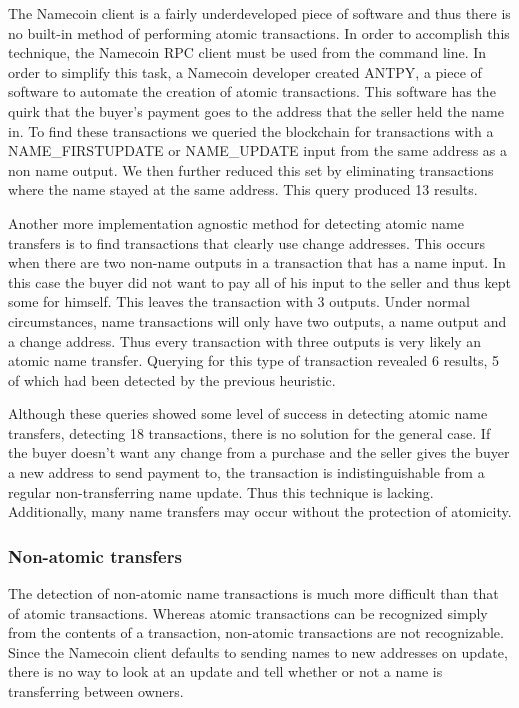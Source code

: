 The Namecoin client is a fairly underdeveloped piece of software and thus there is no built-in method of performing atomic transactions. In order to accomplish this technique, the Namecoin RPC client must be used from the command line. In order to simplify this task, a Namecoin developer created ANTPY, a piece of software to automate the creation of atomic transactions. This software has the quirk that the buyer's payment goes to the address that the seller held the name in. To find these transactions we queried the blockchain for transactions with a NAME\_FIRSTUPDATE or NAME\_UPDATE input from the same address as a non name output. We then further reduced this set by eliminating transactions where the name stayed at the same address. This query produced 13 results.

Another more implementation agnostic method for detecting atomic name transfers is to find transactions that clearly use change addresses. This occurs when there are two non-name outputs in a transaction that has a name input. In this case the buyer did not want to pay all of his input to the seller and thus kept some for himself. This leaves the transaction with 3 outputs. Under normal circumstances, name transactions will only have two outputs, a name output and a change address. Thus every transaction with three outputs is very likely an atomic name transfer. Querying for this type of transaction revealed 6 results, 5 of which had been detected by the previous heuristic.

Although these queries showed some level of success in detecting atomic name transfers, detecting 18 transactions, there is no solution for the general case. If the buyer doesn't want any change from a purchase and the seller gives the buyer a new address to send payment to, the transaction is indistinguishable from a regular non-transferring name update. Thus this technique is lacking. Additionally, many name transfers may occur without the protection of atomicity.

\subsubsection{Non-atomic transfers}

The detection of non-atomic name transactions is much more difficult than that of atomic transactions. Whereas atomic transactions can be recognized simply from the contents of a transaction, non-atomic transactions are not recognizable.  Since the Namecoin client defaults to sending names to new addresses on update, there is no way to look at an update and tell whether or not a name is transferring between owners.

